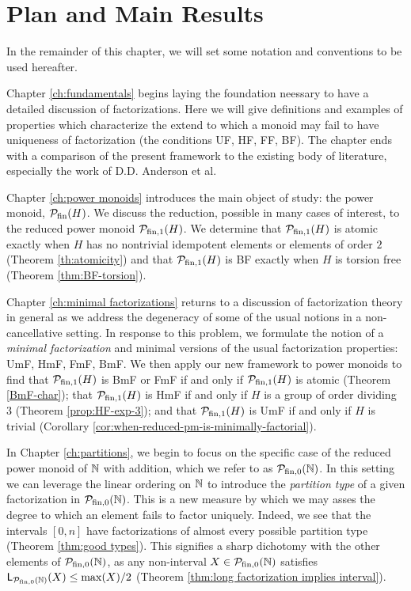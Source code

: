 \section{Plan and Main Results}

In the remainder of this chapter, we will set some notation and conventions to be used hereafter.

Chapter \ref{ch:fundamentals} begins laying the foundation neessary to have a detailed discussion of factorizations.
Here we will give definitions and examples of properties which characterize the extend to which a monoid may fail to have uniqueness of factorization (the conditions UF, HF, FF, BF).  
The chapter ends with a comparison of the present framework to the existing body of literature, especially the work of D.D. Anderson et al.

Chapter \ref{ch:power monoids} introduces the main object of study: the power monoid, $\mathcal{P}_{\textrm{fin}}(H)$.
We discuss the reduction, possible in many cases of interest, to the reduced power monoid $\mathcal{P}_{\textrm{fin}, 1}(H)$.
We determine that $\mathcal{P}_{\textrm{fin}, 1}(H)$ is atomic exactly when $H$ has no nontrivial idempotent elements or elements of order $2$ (Theorem \ref{th:atomicity}) and that $\mathcal{P}_{\textrm{fin}, 1}(H)$ is BF exactly when $H$ is torsion free (Theorem \ref{thm:BF-torsion}).

Chapter \ref{ch:minimal factorizations} returns to a discussion of factorization theory in general as we address the degeneracy of some of the usual notions in a non-cancellative setting.  
In response to this problem, we formulate the notion of a \textit{minimal factorization} and minimal versions of the usual factorization properties: UmF, HmF, FmF, BmF.
We then apply our new framework to power monoids to find that $\mathcal{P}_{\textrm{fin}, 1}(H)$ is BmF or FmF if and only if $\mathcal{P}_{\textrm{fin}, 1}(H)$ is atomic (Theorem \ref{BmF-char}); that $\mathcal{P}_{\textrm{fin}, 1}(H)$ is HmF if and only if $H$ is a group of order dividing $3$ (Theorem \ref{prop:HF-exp-3}); and that $\mathcal{P}_{\textrm{fin}, 1}(H)$ is UmF if and only if $H$ is trivial (Corollary \ref{cor:when-reduced-pm-is-minimally-factorial}).

In Chapter \ref{ch:partitions}, we begin to focus on the specific case of the reduced power monoid of $\mathbb{N}$ with addition, which we refer to as ${\mathcal{P}_{\textrm{fin},0}(\mathbb{N})}$. 
In this setting we can leverage the linear ordering on $\mathbb{N}$ to introduce the \textit{partition type} of a given factorization in ${\mathcal{P}_{\textrm{fin},0}(\mathbb{N})}$.
This is a new measure by which we may asses the degree to which an element fails to factor uniquely.
Indeed, we see that the intervals $[0,n]$ have factorizations of almost every possible partition type (Theorem \ref{thm:good types}).
This signifies a sharp dichotomy with the other elements of ${\mathcal{P}_{\textrm{fin},0}(\mathbb{N})}$, as any non-interval $X\in {\mathcal{P}_{\textrm{fin},0}(\mathbb{N})}$ satisfies $\mathsf{L}_{\mathcal{P}_{\textrm{fin},0}(\mathbb{N})}(X) \le \max(X)/2$ (Theorem \ref{thm:long factorization implies interval}).

